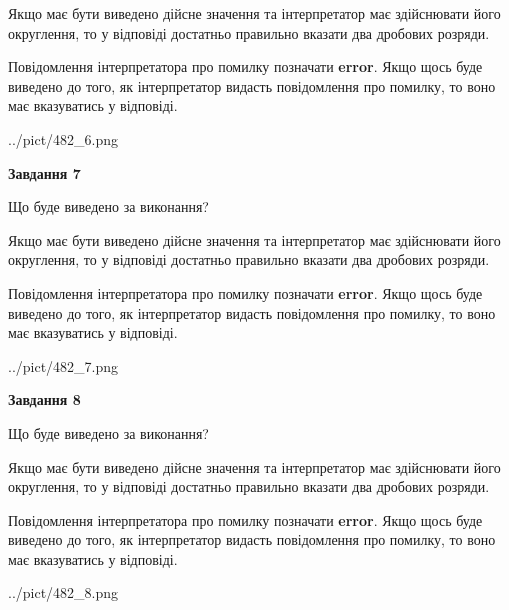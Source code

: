 \documentclass[12pt, ukrainian]{article}
\begin{document}
{\begin {Large}
Якщо має бути виведено дійсне значення та інтерпретатор має здійснювати його округлення, 
то у відповіді достатньо правильно вказати два дробових розряди.

Повідомлення інтерпретатора про помилку позначати \textbf{error}.
Якщо щось буде виведено до того, як інтерпретатор видасть повідомлення про помилку, 
то воно має вказуватись у відповіді. \par

\begin{center}
	{../pict/482_6.png}
\end{center}
\newpage

{\begin {center}\textbf{Завдання 7}\end {center}}\par
Що буде виведено за виконання? \par

Якщо має бути виведено дійсне значення та інтерпретатор має здійснювати його округлення, 
то у відповіді достатньо правильно вказати два дробових розряди.

Повідомлення інтерпретатора про помилку позначати \textbf{error}.
Якщо щось буде виведено до того, як інтерпретатор видасть повідомлення про помилку, 
то воно має вказуватись у відповіді. \par

\begin{center}
	{../pict/482_7.png}
\end{center}
\newpage

{\begin {center}\textbf{Завдання 8}\end {center}}\par
Що буде виведено за виконання? \par

Якщо має бути виведено дійсне значення та інтерпретатор має здійснювати його округлення, 
то у відповіді достатньо правильно вказати два дробових розряди.

Повідомлення інтерпретатора про помилку позначати \textbf{error}.
Якщо щось буде виведено до того, як інтерпретатор видасть повідомлення про помилку, 
то воно має вказуватись у відповіді. \par

\begin{center}
	{../pict/482_8.png}
\end{center}
\newpage


\end{Large}}
\end{document}
